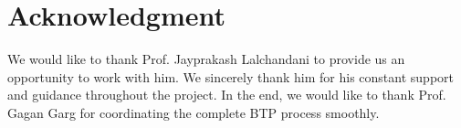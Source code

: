 \documentclass[conference]{IEEEtran}
\begin{document}


\section*{Acknowledgment}

We would like to thank Prof. Jayprakash Lalchandani to provide us an opportunity to work with him. We sincerely thank him for his constant support and guidance throughout the project. In the end, we would like to thank Prof. Gagan Garg for coordinating the complete BTP process smoothly.




\end{document}
